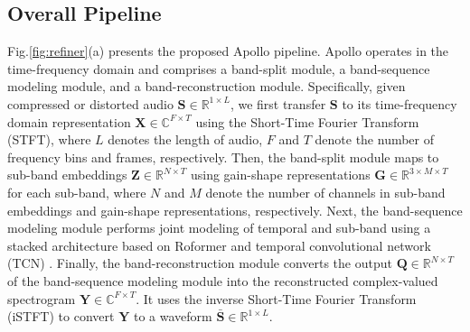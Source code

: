 \subsection{Overall Pipeline}
\label{sec:overall}
Fig.\ref{fig:refiner}(a) presents the proposed Apollo pipeline. Apollo operates in the time-frequency domain and comprises a band-split module, a band-sequence modeling module, and a band-reconstruction module. Specifically, given compressed or distorted audio $\mathbf{S}\in \mathbb{R}^{1\times L}$, we first transfer $\mathbf{S}$ to its time-frequency domain representation $\mathbf{X}\in \mathbb{C}^{F\times T}$ using the Short-Time Fourier Transform (STFT), where $L$ denotes the length of audio, $F$ and $T$ denote the number of frequency bins and frames, respectively. Then, the band-split module maps to sub-band embeddings $\mathbf{Z}\in \mathbb{R}^{N\times T}$ using gain-shape representations $\mathbf{G}\in \mathbb{R}^{3\times M\times T}$ for each sub-band, where $N$ and $M$ denote the number of channels in sub-band embeddings and gain-shape representations, respectively. Next, the band-sequence modeling module performs joint modeling of temporal and sub-band using a stacked architecture based on Roformer \cite{su2024roformer} and temporal convolutional network (TCN) \cite{bai2018empirical,li2022efficient}. Finally, the band-reconstruction module converts the output $\mathbf{Q}\in \mathbb{R}^{N\times T}$ of the band-sequence modeling module into the reconstructed complex-valued spectrogram $\mathbf{Y}\in \mathbb{C}^{F\times T}$. It uses the inverse Short-Time Fourier Transform (iSTFT) to convert $\mathbf{Y}$ to a waveform $\bar{\mathbf{S}}\in \mathbb{R}^{1\times L}$.


